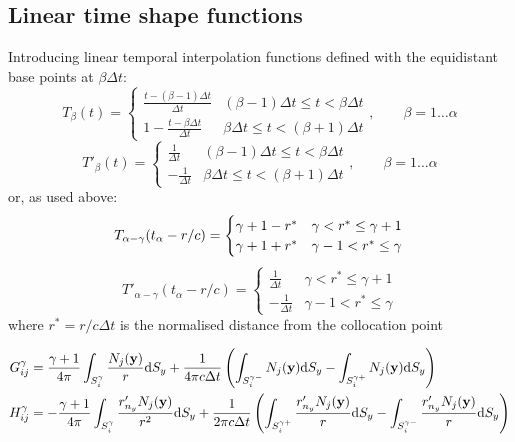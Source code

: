 \documentclass[a4paper,11pt,twoside]{article}
\newcommand{\td}{\mathrm{d}}
\begin{document}
\subsection{Linear time shape functions}

Introducing linear temporal interpolation functions defined with the equidistant base points at $\beta \Delta t$:
%
\begin{equation}
T_{\beta}(t) = \begin{cases}
\frac{t-(\beta-1)\Delta t}{\Delta t} & (\beta-1)\Delta t \le t < \beta \Delta t \\
1-\frac{t-\beta\Delta t}{\Delta t} & \beta\Delta t \le t < (\beta+1) \Delta t
\end{cases}, \qquad \beta = 1 \dots \alpha
\end{equation}
%
\begin{equation}
T'_{\beta}(t) = \begin{cases}
\frac{1}{\Delta t} & (\beta-1)\Delta t \le t < \beta \Delta t \\
-\frac{1}{\Delta t} & \beta\Delta t \le t < (\beta+1) \Delta t
\end{cases}, \qquad \beta = 1 \dots \alpha
\end{equation}
%
or, as used above:
%
\begin{equation}
T_{\alpha-\gamma}(t_{\alpha}-r/c)
= \begin{cases}
\gamma + 1 -r^* & \gamma < r^* \le \gamma+1 \\
\gamma + 1 +r^* & \gamma-1 < r^* \le \gamma
\end{cases} \nonumber \\
\end{equation}
%
\begin{equation}
T'_{\alpha-\gamma}(t_{\alpha}-r/c) = \begin{cases}
\frac{1}{\Delta t} & \gamma < r^* \le \gamma+1 \\
-\frac{1}{\Delta t} & \gamma-1 < r^* \le \gamma
\end{cases}
\end{equation}
%
where $r^* = r/c\Delta t$ is the normalised distance from the collocation point


\begin{align}
G_{ij}^{\gamma}
&=
\frac{\gamma + 1}{4\pi}
\int_{S_i^{\gamma}}
\frac{N_j({\bf y})}{r}
\td S_{y}
+
\frac{1}{4\pi c \Delta t}
\left(
\int_{S_i^{\gamma-}}
N_j({\bf y})
\td S_{y}
-
\int_{S_i^{\gamma+}}
N_j({\bf y})
\td S_{y}
\right) \nonumber \\
H_{ij}^{\gamma}
&=
-
\frac{\gamma+1}{4\pi}
\int_{S_{i}^{\gamma}}
\frac{r'_{n_{y}} N_j({\bf y})}{r^2}
\td S_{y}
+
\frac{1}{2\pi c \Delta t}
\left(
\int_{S_{i}^{\gamma+}}
\frac{r'_{n_{y}} N_j({\bf y})}{r}
\td S_{y}
-
\int_{S_{i}^{\gamma-}}
\frac{r'_{n_{y}} N_j({\bf y})}{r}
\td S_{y}
\right)
\end{align}
\end{document}
